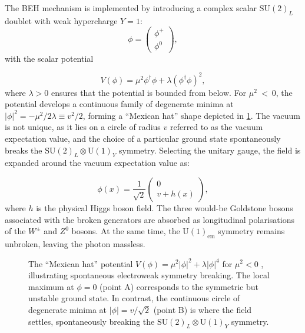\vspace{0.5 cm}

The BEH mechanism is implemented by introducing a complex scalar $\mathrm{SU}(2)_L$ doublet with weak hypercharge $Y = 1$:
\begin{equation}
    \phi = \begin{pmatrix} \phi^+ \\ \phi^0 \end{pmatrix},
\end{equation}
with the scalar potential

\begin{equation}
    V(\phi) = \mu^2 \phi^\dagger \phi + \lambda (\phi^\dagger \phi)^2,
\end{equation}
where $\lambda > 0$ ensures that the potential is bounded from below. For $\mu^2~<~0$, the potential develops a continuous family of degenerate minima at $|\phi|^2 = -\mu^2 / 2\lambda \equiv v^2/2$, forming a ``Mexican hat'' shape depicted in \cref{fig:higgsshape}. The vacuum is not unique, as it lies on a circle of radius $v$ referred to as the vacuum expectation value, and the choice of a particular ground state spontaneously breaks the $\mathrm{SU}(2)_L \otimes \mathrm{U}(1)_Y$ symmetry. Selecting the unitary gauge, the field is expanded around the vacuum expectation value as:

\begin{equation}
    \phi(x) = \frac{1}{\sqrt{2}} \begin{pmatrix} 0 \\ v + h(x) \end{pmatrix},
\end{equation}
where $h$ is the physical Higgs boson field. The three would-be Goldstone bosons associated with the broken generators are absorbed as longitudinal polarisations of the $W^\pm$ and $Z^0$ bosons. At the same time, the $\mathrm{U}(1)_{\mathrm{em}}$ symmetry remains unbroken, leaving the photon massless.

\begin{figure}[h]
    \centering
    
    \caption{The ``Mexican hat'' potential $V(\phi) = \mu^2|\phi|^2 + \lambda|\phi|^4$ for $\mu^2 < 0$ \cite{tikz}, illustrating spontaneous electroweak symmetry breaking. The local maximum at $\phi = 0$ (point A) corresponds to the symmetric but unstable ground state. In contrast, the continuous circle of degenerate minima at $|\phi| = v/\sqrt{2}$ (point B) is where the field settles, spontaneously breaking the $\mathrm{SU}(2)_L \otimes \mathrm{U}(1)_Y$ symmetry.}
    \label{fig:higgsshape}
\end{figure}

